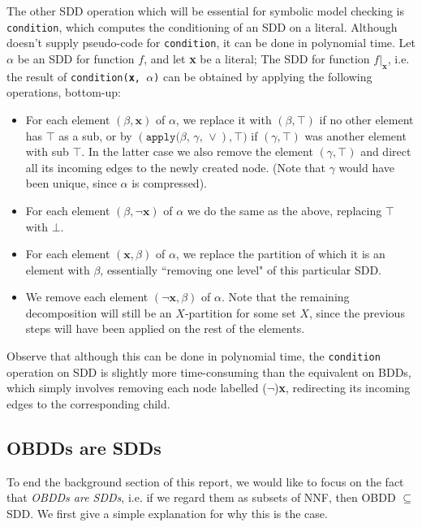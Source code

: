 \documentclass[11pt]{report}
\begin{document}
The other SDD operation which will be essential for symbolic model checking is \texttt{condition}, which computes the conditioning of an SDD on a literal. 
Although \cite{sdd_1} doesn't supply pseudo-code for \texttt{condition}, it can be done in polynomial time.
Let $\alpha$ be an SDD for function $f$, and let \textbf{x} be a literal; The SDD for function $f|_{\textbf{x}}$, i.e. the result of \texttt{condition(\textbf{x}, $\alpha$)} can be obtained by applying the following operations, bottom-up:
\begin{itemize}
\item For each element $(\beta, \textbf{x})$ of $\alpha$, we replace it with $(\beta, \top)$ if no other element has $\top$ as a sub, or by $(\texttt{apply($\beta$, $\gamma$, $\lor$}), \top)$ if $(\gamma, \top)$ was another element with sub $\top$. In the latter case we also remove the element $(\gamma, \top)$ and direct all its incoming edges to the newly created node. (Note that $\gamma$ would have been unique, since $\alpha$ is compressed).

\item For each element $(\beta, \lnot\textbf{x})$ of $\alpha$ we do the same as the above, replacing $\top$ with $\bot$.

\item For each element $(\textbf{x}, \beta)$ of $\alpha$, we replace the partition of which it is an element with $\beta$, essentially ``removing one level" of this particular SDD.

\item We remove each element  $(\lnot\textbf{x}, \beta)$ of $\alpha$. Note that the remaining decomposition will still be an $X$-partition for some set $X$, since the previous steps will have been applied on the rest of the elements.
\end{itemize}
Observe that although this can be done in polynomial time, the \texttt{condition} operation on SDD is slightly more time-consuming than the equivalent on BDDs, which simply involves removing each node labelled ($\lnot$)\textbf{x}, redirecting its incoming edges to the corresponding child. 


\subsection{OBDDs are SDDs}
\label{bdds_are_sdds}
To end the background section of this report, we would like to  focus on the fact that \textit{OBDDs are SDDs}, i.e. if we regard them as subsets of NNF, then OBDD $\subseteq$ SDD. We first give a simple explanation for why this is the case. 
\end{document}
